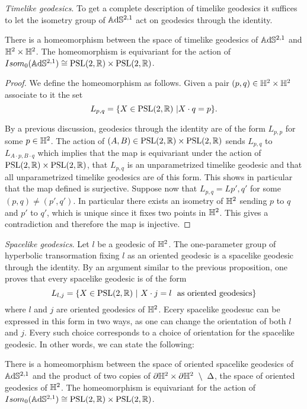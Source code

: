 \noindent\textit{Timelike geodesics}.
To get a complete description of timelike geodesics it suffices to let the isometry group of $\mathbb{A}\mathrm{d}\mathbb{S}^{2,1}$ act on geodesics through the identity.
\begin{proposition}
    There is a homeomorphism between the space of timelike geodesics of $\mathbb{A}\mathrm{d}\mathbb{S}^{2,1}$ and $\mathbb{H}^2 \times \mathbb{H}^2$.
    The homeomorphism is equivariant for the action of $Isom_0(\mathbb{A}\mathrm{d}\mathbb{S}^{2,1}) \cong \text{PSL}(2,\mathbb{R}) \times \text{PSL}(2,\mathbb{R})$.
\end{proposition}
\begin{proof}
    We define the homeomorphism as follows. Given a pair $(p,q) \in \mathbb{H}^2\times\mathbb{H}^2$ associate to it the set
    \[
        L_{p,q} = \{X \in \text{PSL}(2,\mathbb{R}) \ | X \cdot q = p\}.
    \]
    
    By a previous discussion, geodesics through the identity are of the form $L_{p,p}$ for some $p\in\mathbb{H}^2$. The action of $(A,B) \in \text{PSL}(2,\mathbb{R}) \times \text{PSL}(2,\mathbb{R})$ sends $L_{p,q}$ to $L_{A\cdot p, B\cdot q}$ which implies that the map is equivariant under the action of $\text{PSL}(2,\mathbb{R})\times\text{PSL}(2,\mathbb{R})$, that $L_{p,q}$ is an unparametrized timelike geodesic and that all unparametrized timelike geodesics are of this form. This shows in particular that the map defined is surjective.
    Suppose now that $L_{p,q} = L{p',q'}$ for some $(p,q) \neq (p',q')$. In particular there exists an isometry of $\mathbb{H}^2$ sending $p$ to $q$ and $p'$ to $q'$, which is unique since it fixes two points in $\mathbb{H}^2$. This gives a contradiction and therefore the map is injective.
\end{proof}

\noindent\textit{Spacelike geodesics}.
Let $l$ be a geodesic of $\mathbb{H}^2$. The one-parameter group of hyperbolic transormation fixing $l$ as an oriented geodesic is a spacelike geodesic through the identity. By an argument similar to the previous proposition, one proves that every spacelike geodesic is of the form
\[
    L_{l,j} = \{ X \in\text{PSL}(2,\mathbb{R}) \ | \ X \cdot j = l \ \ \text{as oriented geodesics} \}
\]
where $l$ and $j$ are oriented geodesics of $\mathbb{H}^2$. Ecery spacelike geodesuc can be expressed in this form in two ways, as one can change the orientation of both $l$ and $j$. Every such choice corresponds to a choice of orientation for the spacelike geodesic. In other words, we can state the following:
\begin{proposition}
    There is a homeomorphism between the space of oriented spacelike geodesics of $\mathbb{A}\mathrm{d}\mathbb{S}^{2,1}$ and the product of two copies of $\partial \mathbb{H}^2 \times \partial \mathbb{H}^2 \ \setminus \ \Delta$, the space of oriented geodesics of $\mathbb{H}^2$. 
    The homeomorphism is equivariant for the action of $Isom_0(\mathbb{A}\mathrm{d}\mathbb{S}^{2,1}) \cong \text{PSL}(2,\mathbb{R}) \times \text{PSL}(2,\mathbb{R})$.
\end{proposition}